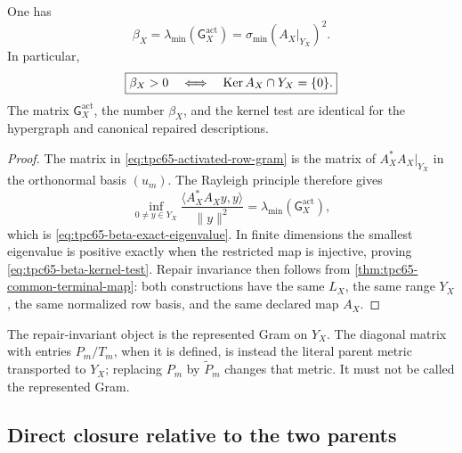 \begin{proposition}
\label{prop:tpc65-repair-invariant-beta}
One has
\begin{equation}
 \boxed{
 \beta_X
 =
 \lambda_{\min}\!\left(\mathsf G_X^{\mathrm{act}}\right)
 =
 \sigma_{\min}(A_X|_{Y_X})^2.}
 \label{eq:tpc65-beta-exact-eigenvalue}
\end{equation}
In particular,
\begin{equation}
 \boxed{
 \beta_X>0
 \quad\Longleftrightarrow\quad
 \operatorname{Ker} A_X\cap Y_X=\{0\}.}
 \label{eq:tpc65-beta-kernel-test}
\end{equation}
The matrix \(\mathsf G_X^{\mathrm{act}}\), the number \(\beta_X\), and
the kernel test are identical for the hypergraph and canonical repaired
descriptions.
\end{proposition}

\begin{proof}
The matrix in \eqref{eq:tpc65-activated-row-gram} is the matrix of
\(A_X^*A_X|_{Y_X}\) in the orthonormal basis \((u_m)\).  The Rayleigh
principle therefore gives
\[
 \inf_{0\ne y\in Y_X}
 \frac{\langle A_X^*A_Xy,y\rangle}{\|y\|^2}
 =
 \lambda_{\min}(\mathsf G_X^{\mathrm{act}}),
\]
which is \eqref{eq:tpc65-beta-exact-eigenvalue}.  In finite dimensions
the smallest eigenvalue is positive exactly when the restricted map is
injective, proving \eqref{eq:tpc65-beta-kernel-test}.  Repair invariance
then follows from \cref{thm:tpc65-common-terminal-map}: both constructions
have the same \(L_X\), the same range \(Y_X\), the same normalized row
basis, and the same declared map \(A_X\).
\end{proof}

\begin{remark}
\label{rem:tpc65-parent-versus-represented-gram}
The repair-invariant object is the represented Gram on \(Y_X\).  The
diagonal matrix with entries \(P_m/T_m\), when it is defined, is instead
the literal parent metric transported to \(Y_X\); replacing \(P_m\) by
\(\widetilde P_m\) changes that metric.  It must not be called the
represented Gram.
\end{remark}

\subsection{Direct closure relative to the two parents}

